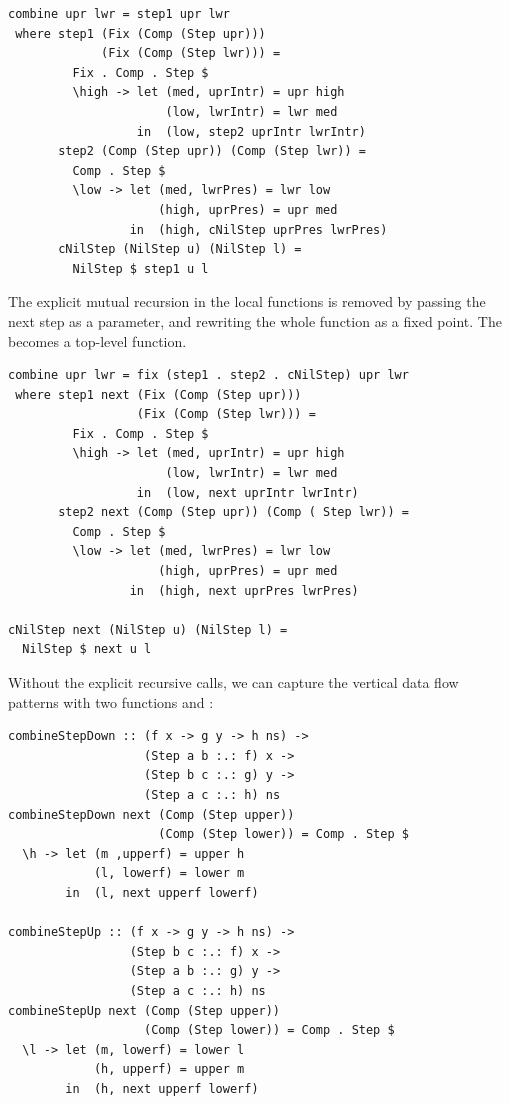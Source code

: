 \documentclass[preprint,natbib]{sigplanconf}
\begin{document}
\begin{small} %
\begin{verbatim}
combine upr lwr = step1 upr lwr
 where step1 (Fix (Comp (Step upr))) 
             (Fix (Comp (Step lwr))) = 
         Fix . Comp . Step $ 
         \high -> let (med, uprIntr) = upr high
                      (low, lwrIntr) = lwr med
                  in  (low, step2 uprIntr lwrIntr)
       step2 (Comp (Step upr)) (Comp (Step lwr)) = 
         Comp . Step $
         \low -> let (med, lwrPres) = lwr low
                     (high, uprPres) = upr med
                 in  (high, cNilStep uprPres lwrPres)
       cNilStep (NilStep u) (NilStep l) = 
         NilStep $ step1 u l 
\end{verbatim}%
\end{small}

The explicit mutual recursion in the local functions is removed by passing the next step as a parameter, and rewriting the whole function as a fixed point. The  becomes a top-level function.

\begin{small} %
\begin{verbatim}
combine upr lwr = fix (step1 . step2 . cNilStep) upr lwr
 where step1 next (Fix (Comp (Step upr))) 
                  (Fix (Comp (Step lwr))) = 
         Fix . Comp . Step $ 
         \high -> let (med, uprIntr) = upr high
                      (low, lwrIntr) = lwr med
                  in  (low, next uprIntr lwrIntr)
       step2 next (Comp (Step upr)) (Comp ( Step lwr)) = 
         Comp . Step $
         \low -> let (med, lwrPres) = lwr low
                     (high, uprPres) = upr med
                 in  (high, next uprPres lwrPres)

cNilStep next (NilStep u) (NilStep l) = 
  NilStep $ next u l
\end{verbatim}%
\end{small}

Without the explicit recursive calls, we can capture the vertical data flow patterns with two functions  and :

\begin{small} 
\begin{verbatim}
combineStepDown :: (f x -> g y -> h ns) -> 
                   (Step a b :.: f) x -> 
                   (Step b c :.: g) y -> 
                   (Step a c :.: h) ns
combineStepDown next (Comp (Step upper)) 
                     (Comp (Step lower)) = Comp . Step $
  \h -> let (m ,upperf) = upper h
            (l, lowerf) = lower m
        in  (l, next upperf lowerf)   

combineStepUp :: (f x -> g y -> h ns) ->
                 (Step b c :.: f) x ->
                 (Step a b :.: g) y ->
                 (Step a c :.: h) ns
combineStepUp next (Comp (Step upper)) 
                   (Comp (Step lower)) = Comp . Step $ 
  \l -> let (m, lowerf) = lower l
            (h, upperf) = upper m
        in  (h, next upperf lowerf)   
\end{verbatim}%
\end{small}
\end{document}
